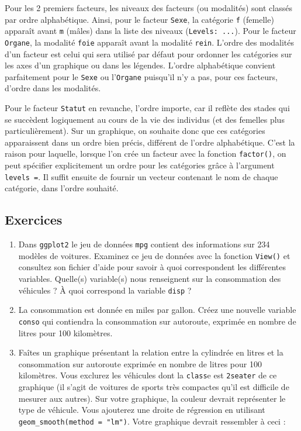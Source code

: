 \documentclass[
  a4paper,
  DIV=11,
  numbers=noendperiod,
  oneside]{scrreprt}
\begin{document}
Pour les 2 premiers facteurs, les niveaux des facteurs (ou modalités)
sont classés par ordre alphabétique. Ainsi, pour le facteur
\texttt{Sexe}, la catégorie \texttt{f} (femelle) apparaît avant
\texttt{m} (mâles) dans la liste des niveaux (\texttt{Levels:\ ...}).
Pour le facteur \texttt{Organe}, la modalité \texttt{foie} apparaît
avant la modalité \texttt{rein}. L'ordre des modalités d'un facteur est
celui qui sera utilisé par défaut pour ordonner les catégories sur les
axes d'un graphique ou dans les légendes. L'ordre alphabétique convient
parfaitement pour le \texttt{Sexe} ou l'\texttt{Organe} puisqu'il n'y a
pas, pour ces facteurs, d'ordre dans les modalités.

Pour le facteur \texttt{Statut} en revanche, l'ordre importe, car il
reflète des stades qui se succèdent logiquement au cours de la vie des
individus (et des femelles plus particulièrement). Sur un graphique, on
souhaite donc que ces catégories apparaissent dans un ordre bien précis,
différent de l'ordre alphabétique. C'est la raison pour laquelle,
lorsque l'on crée un facteur avec la fonction \texttt{factor()}, on peut
spécifier explicitement un ordre pour les catégories grâce à l'argument
\texttt{levels\ =}. Il suffit ensuite de fournir un vecteur contenant le
nom de chaque catégorie, dans l'ordre souhaité.

\subsection{Exercices}\label{exercices-1}

\begin{enumerate}
\def\labelenumi{\arabic{enumi}.}
\item
  Dans \texttt{ggplot2} le jeu de données \texttt{mpg} contient des
  informations sur 234 modèles de voitures. Examinez ce jeu de données
  avec la fonction \texttt{View()} et consultez son fichier d'aide pour
  savoir à quoi correspondent les différentes variables. Quelle(s)
  variable(s) nous renseignent sur la consommation des véhicules ? À
  quoi correspond la variable \texttt{disp} ?
\item
  La consommation est donnée en miles par gallon. Créez une nouvelle
  variable \texttt{conso} qui contiendra la consommation sur autoroute,
  exprimée en nombre de litres pour 100 kilomètres.
\item
  Faîtes un graphique présentant la relation entre la cylindrée en
  litres et la consommation sur autoroute exprimée en nombre de litres
  pour 100 kilomètres. Vous exclurez les véhicules dont la
  \texttt{class}e est \texttt{2seater} de ce graphique (il s'agit de
  voitures de sports très compactes qu'il est difficile de mesurer aux
  autres). Sur votre graphique, la couleur devrait représenter le type
  de véhicule. Vous ajouterez une droite de régression en utilisant
  \texttt{geom\_smooth(method\ =\ "lm")}. Votre graphique devrait
  ressembler à ceci :
\end{enumerate}
\end{document}
